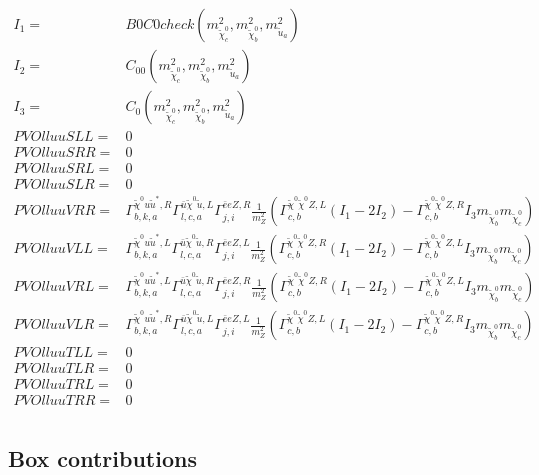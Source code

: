 \documentclass[A4,landscape]{article}
\begin{document}
\begin{align} 
I_1= & B0C0check(m^2_{\tilde{\chi}^0_{{c}}}, m^2_{\tilde{\chi}^0_{{b}}}, m^2_{\tilde{u}_{{a}}}) \\ 
I_2= & C_{00}(m^2_{\tilde{\chi}^0_{{c}}}, m^2_{\tilde{\chi}^0_{{b}}}, m^2_{\tilde{u}_{{a}}}) \\ 
I_3= & C_0(m^2_{\tilde{\chi}^0_{{c}}}, m^2_{\tilde{\chi}^0_{{b}}}, m^2_{\tilde{u}_{{a}}}) \\ 
  PVOlluuSLL= & 0 \\ 
  PVOlluuSRR= & 0 \\ 
  PVOlluuSRL= & 0 \\ 
  PVOlluuSLR= & 0 \\ 
  PVOlluuVRR= &  \Gamma^{\tilde{\chi}^0 u \tilde{u}^*,R}_{b, k, a} \Gamma^{\bar{u}\tilde{\chi}^0 \tilde{u} ,L}_{l, c, a} \Gamma^{\bar{e}e Z ,R}_{j, i} \frac{1}{m^2_{Z}} (\Gamma^{\tilde{\chi}^0 \tilde{\chi}^0 Z ,L}_{c, b} (I_1 - 2 I_2) - \Gamma^{\tilde{\chi}^0 \tilde{\chi}^0 Z ,R}_{c, b} I_3 m_{\tilde{\chi}^0_{{b}}} m_{\tilde{\chi}^0_{{c}}}) \\ 
  PVOlluuVLL= &  \Gamma^{\tilde{\chi}^0 u \tilde{u}^*,L}_{b, k, a} \Gamma^{\bar{u}\tilde{\chi}^0 \tilde{u} ,R}_{l, c, a} \Gamma^{\bar{e}e Z ,L}_{j, i} \frac{1}{m^2_{Z}} (\Gamma^{\tilde{\chi}^0 \tilde{\chi}^0 Z ,R}_{c, b} (I_1 - 2 I_2) - \Gamma^{\tilde{\chi}^0 \tilde{\chi}^0 Z ,L}_{c, b} I_3 m_{\tilde{\chi}^0_{{b}}} m_{\tilde{\chi}^0_{{c}}}) \\ 
  PVOlluuVRL= &  \Gamma^{\tilde{\chi}^0 u \tilde{u}^*,L}_{b, k, a} \Gamma^{\bar{u}\tilde{\chi}^0 \tilde{u} ,R}_{l, c, a} \Gamma^{\bar{e}e Z ,R}_{j, i} \frac{1}{m^2_{Z}} (\Gamma^{\tilde{\chi}^0 \tilde{\chi}^0 Z ,R}_{c, b} (I_1 - 2 I_2) - \Gamma^{\tilde{\chi}^0 \tilde{\chi}^0 Z ,L}_{c, b} I_3 m_{\tilde{\chi}^0_{{b}}} m_{\tilde{\chi}^0_{{c}}}) \\ 
  PVOlluuVLR= &  \Gamma^{\tilde{\chi}^0 u \tilde{u}^*,R}_{b, k, a} \Gamma^{\bar{u}\tilde{\chi}^0 \tilde{u} ,L}_{l, c, a} \Gamma^{\bar{e}e Z ,L}_{j, i} \frac{1}{m^2_{Z}} (\Gamma^{\tilde{\chi}^0 \tilde{\chi}^0 Z ,L}_{c, b} (I_1 - 2 I_2) - \Gamma^{\tilde{\chi}^0 \tilde{\chi}^0 Z ,R}_{c, b} I_3 m_{\tilde{\chi}^0_{{b}}} m_{\tilde{\chi}^0_{{c}}}) \\ 
  PVOlluuTLL= & 0 \\ 
  PVOlluuTLR= & 0 \\ 
  PVOlluuTRL= & 0 \\ 
  PVOlluuTRR= & 0 \\ 
\end{align} 
\subsection{Box contributions} 
\end{document}
